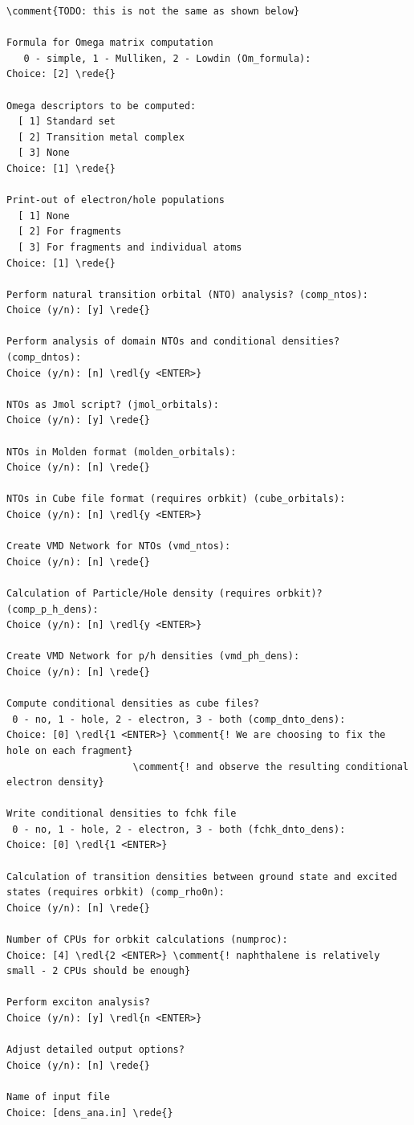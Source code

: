 \documentclass[DIV=12,headings=normal]{scrartcl}
\newcommand{\comment}[1]{\textcolor{blue}{#1}}
\newcommand{\redl}[1]{{\textcolor{red}{\underline{#1}}}}
\newcommand{\rede}[1]{\redl{#1 <ENTER>}}
\begin{document}
\begin{Verbatim}[commandchars=\\\{\}]
\comment{TODO: this is not the same as shown below}

Formula for Omega matrix computation
   0 - simple, 1 - Mulliken, 2 - Lowdin (Om_formula):
Choice: [2] \rede{}

Omega descriptors to be computed:
  [ 1] Standard set
  [ 2] Transition metal complex
  [ 3] None
Choice: [1] \rede{}

Print-out of electron/hole populations
  [ 1] None
  [ 2] For fragments
  [ 3] For fragments and individual atoms
Choice: [1] \rede{}

Perform natural transition orbital (NTO) analysis? (comp_ntos):
Choice (y/n): [y] \rede{}

Perform analysis of domain NTOs and conditional densities? (comp_dntos):
Choice (y/n): [n] \redl{y <ENTER>}

NTOs as Jmol script? (jmol_orbitals):
Choice (y/n): [y] \rede{}

NTOs in Molden format (molden_orbitals):
Choice (y/n): [n] \rede{}

NTOs in Cube file format (requires orbkit) (cube_orbitals):
Choice (y/n): [n] \redl{y <ENTER>}

Create VMD Network for NTOs (vmd_ntos):
Choice (y/n): [n] \rede{}

Calculation of Particle/Hole density (requires orbkit)? (comp_p_h_dens):
Choice (y/n): [n] \redl{y <ENTER>}

Create VMD Network for p/h densities (vmd_ph_dens):
Choice (y/n): [n] \rede{}

Compute conditional densities as cube files?
 0 - no, 1 - hole, 2 - electron, 3 - both (comp_dnto_dens):
Choice: [0] \redl{1 <ENTER>} \comment{! We are choosing to fix the hole on each fragment}
                      \comment{! and observe the resulting conditional electron density}

Write conditional densities to fchk file
 0 - no, 1 - hole, 2 - electron, 3 - both (fchk_dnto_dens):
Choice: [0] \redl{1 <ENTER>}

Calculation of transition densities between ground state and excited states (requires orbkit) (comp_rho0n):
Choice (y/n): [n] \rede{}

Number of CPUs for orbkit calculations (numproc):
Choice: [4] \redl{2 <ENTER>} \comment{! naphthalene is relatively small - 2 CPUs should be enough} 

Perform exciton analysis?
Choice (y/n): [y] \redl{n <ENTER>}

Adjust detailed output options?
Choice (y/n): [n] \rede{}

Name of input file
Choice: [dens_ana.in] \rede{} 
\end{Verbatim}
\normalsize
\end{document}

